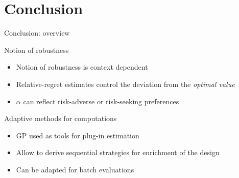 \documentclass[10pt,aspectratio=169,usepdftitle=false]{beamer}
\begin{document}
\section{Conclusion}

\begin{frame}[label=conclusion]{Conclusion: overview}
  \begin{block}{Notion of robustness}
    \begin{itemize}
    \item Notion of robustness is context dependent
    \item Relative-regret estimates control the deviation from the \textit{optimal value}  
    \item $\alpha$ can reflect risk-adverse or risk-seeking preferences
    \end{itemize}
  \end{block}

  \begin{block}{Adaptive methods for computations}
    \begin{itemize}
    \item GP used as tools for plug-in estimation
    \item Allow to derive sequential strategies for enrichment of the design
    \item Can be adapted for batch evaluations
    \end{itemize}
  \end{block}
\end{frame}
\end{document}
